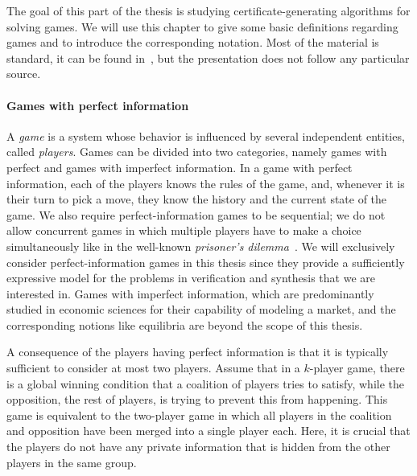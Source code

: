 \documentclass[../../diss.tex]{subfiles}
\begin{document}

The goal of this part of the thesis is studying certificate-generating algorithms for solving games.
We will use this chapter to give some basic definitions regarding games and to introduce the corresponding notation.
Most of the material is standard, it can be found \eg in~\cite{KhoussainovN01}, but the presentation does not follow any particular source.

\paragraph{Games with perfect information}

A \emph{game} is a system whose behavior is influenced by several independent entities, called \emph{players}.
Games can be divided into two categories, namely games with perfect and games with imperfect information.
In a game with perfect information, each of the players knows the rules of the game, and, whenever it is their turn to pick a move, they know the history and the current state of the game.
We also require perfect-information games to be sequential; we do not allow concurrent games in which multiple players have to make a choice simultaneously like in the well-known \emph{prisoner's dilemma}~\cite{Poundstone92}.
We will exclusively consider perfect-information games in this thesis since they provide a sufficiently expressive model for the problems in verification and synthesis that we are interested in.
Games with imperfect information, which are predominantly studied in economic sciences for their capability of modeling a market, and the corresponding notions like equilibria are beyond the scope of this thesis.

A consequence of the players having perfect information is that it is typically sufficient to consider at most two players.
Assume that in a $k$-player game, there is a global winning condition that a coalition of players tries to satisfy, while the opposition, the rest of players, is trying to prevent this from happening.
This game is equivalent to the two-player game in which all players in the coalition and opposition have been merged into a single player each.
Here, it is crucial that the players do not have any private information that is hidden from the other players in the same group.
\end{document}
